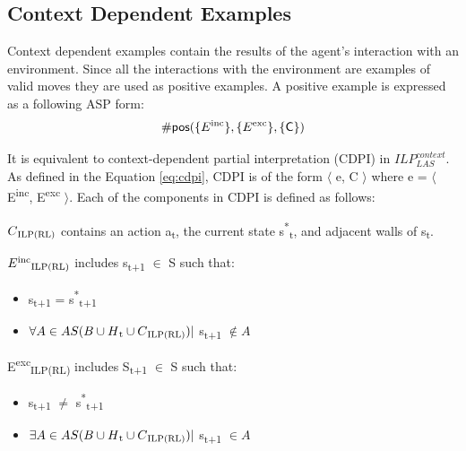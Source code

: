 \subsection{Context Dependent Examples}
Context dependent examples contain the results of the agent's interaction with an environment. 
Since all the interactions with the environment are examples of valid moves
they are used as positive examples. A positive example is expressed as a following ASP form:
\begin{equation}
\begin{split}
    \textsf{\#pos}(\{E\textsuperscript{inc}\}, \{E\textsuperscript{exc}\}, \textsf{\{C\}})
\end{split}
\end{equation}

It is equivalent to context-dependent partial interpretation (CDPI) in  $ILP_{LAS}^{context}$. 
As defined in the Equation \ref{eq:cdpi}, CDPI is of the form $\langle$ e, C $\rangle$ where e = $\langle$ E\textsuperscript{inc}, E\textsuperscript{exc} $\rangle$. 
Each of the components in CDPI is defined as follows:

\begin{defn}\label{def:ILPRL_context}
$C\textsubscript{ILP(RL)}$ contains an action a\textsubscript{t}, the current state s\textsuperscript{*}\textsubscript{t}, and adjacent walls of s\textsubscript{t}.
\label{def:context}
\end{defn}

\begin{defn} \label{def:ILPRL_inc}
$E\textsuperscript{inc}\textsubscript{ILP(RL)}$ includes s\textsubscript{t+1} $\in$ S such that:
\begin{itemize}
\item s\textsubscript{t+1} = s\textsuperscript{*}\textsubscript{t+1}
\item $ \forall A \in AS(B \cup H\textsubscript{t} \cup C\textsubscript{ILP(RL)})|$ s\textsubscript{t+1} $\not\in A$
\end{itemize}
\end{defn}

\begin{defn} \label{def:ILPRL_exc}
E\textsuperscript{exc}\textsubscript{ILP(RL)} includes S\textsubscript{t+1} $\in$ S such that:
\begin{itemize}
\item s\textsubscript{t+1} $\neq$ s\textsuperscript{*}\textsubscript{t+1}
\item $ \exists A \in AS(B \cup H\textsubscript{t} \cup C\textsubscript{ILP(RL)})|$ s\textsubscript{t+1} $\in A$
\end{itemize}
\end{defn}

